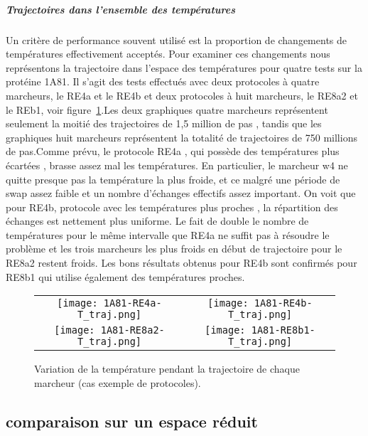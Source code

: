 \subparagraph{Trajectoires dans l'ensemble des températures}

Un critère de performance souvent utilisé est la proportion de changements de températures effectivement acceptés. Pour examiner ces changements nous représentons la trajectoire dans l'espace des températures pour quatre tests sur la protéine 1A81. Il s'agit des tests effectués avec deux protocoles à quatre marcheurs, le RE4a et le RE4b et deux protocoles à huit marcheurs, le RE8a2 et le REb1, voir figure~\ref{graph:TRAJ_T}.Les deux graphiques quatre marcheurs représentent seulement la moitié des trajectoires de 1,5 million de pas , tandis que les graphiques huit marcheurs représentent la totalité de trajectoires de 750 millions de pas.Comme prévu, le protocole RE4a , qui possède des températures plus écartées , brasse assez mal les températures. En particulier, le marcheur w4 ne quitte presque pas la température la plus froide, et ce malgré une période de swap assez faible et un nombre d'échanges effectifs assez important. On voit que pour RE4b, protocole avec les températures plus proches , la répartition des échanges est nettement plus uniforme. Le fait de double le nombre de températures pour le même intervalle que RE4a ne suffit pas à résoudre le problème et les trois marcheurs les plus froids en début de trajectoire pour le RE8a2 restent froids. Les bons résultats obtenus pour RE4b sont confirmés pour RE8b1 qui utilise également des températures proches.     


   \begin{figure}[t]
     \centering
     \begin{tabular}{cc}
       \texttt{[image: 1A81-RE4a-T\_traj.png]} &
       \texttt{[image: 1A81-RE4b-T\_traj.png]} \\
       \texttt{[image: 1A81-RE8a2-T\_traj.png]} &
       \texttt{[image: 1A81-RE8b1-T\_traj.png]} \\
     \end{tabular}
     \caption{Variation de la température pendant la trajectoire de chaque marcheur (cas exemple de protocoles).}
\label{graph:TRAJ_T}
   \end{figure}


    \clearpage

   \subsection{comparaison sur un espace réduit}
 
